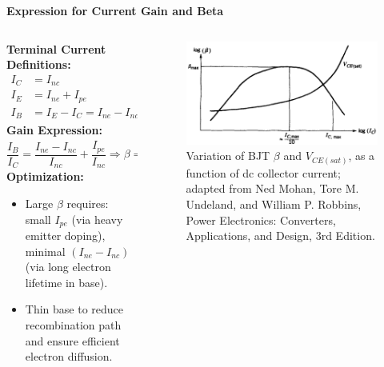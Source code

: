 \begin{frame}{\textbf{Expression for Current Gain and Beta}}
    \begin{columns}
\begin{column}{0.65\textwidth}
\textbf{Terminal Current Definitions:}
\begin{equation}
\begin{aligned}
I_C &= I_{nc} \\
I_E &= I_{ne} + I_{pe} \\
I_B &= I_E - I_C = I_{ne} - I_{nc} + I_{pe}
\end{aligned}
\end{equation}
\textbf{Gain Expression:}
\begin{equation}
\frac{I_B}{I_C} = \frac{I_{ne} - I_{nc}}{I_{nc}} + \frac{I_{pe}}{I_{nc}} \Rightarrow \beta = \left( \frac{I_B}{I_C} \right)^{-1}
\end{equation}
\textbf{Optimization:}
\begin{itemize}
    \item Large $\beta$ requires: small $I_{pe}$ (via heavy emitter doping), minimal $(I_{ne} - I_{nc})$ (via long electron lifetime in base).
    \item Thin base to reduce recombination path and ensure efficient electron diffusion.
\end{itemize}
\end{column}

\begin{column}{0.35\textwidth}
\begin{figure}
    \centering
    \includegraphics[width=1\textwidth]{fig/lec04/BJT_Current_gain_plot.png}
    \caption{Variation of BJT $\beta$ and $V_{CE(sat)}$, as a function of dc collector current; adapted from Ned Mohan, Tore M. Undeland, and William P. Robbins, Power Electronics: Converters, Applications, and Design, 3rd Edition.}
\end{figure}
\end{column}
\end{columns}
\end{frame}


